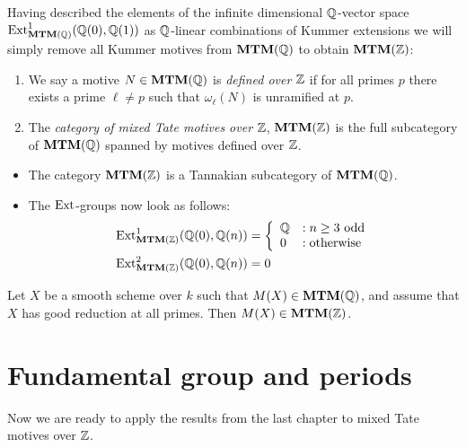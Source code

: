 Having described the elements of the infinite dimensional $\mathbb{Q}$-vector
space $\mathrm{Ext}^{1}_{\mathbf{MTM}(\mathbb{Q})}(\mathbb{Q}(0),\mathbb{Q}(1))$ as $\mathbb{Q}$-linear combinations
of Kummer extensions we will simply remove all Kummer motives from
$\mathbf{MTM}(\mathbb{Q})$ to obtain $\mathbf{MTM}(\mathbb{Z})$:
\begin{defn}
  \begin{enumerate}
  \item We say a motive $N\in\mathbf{MTM}(\mathbb{Q})$ is \emph{defined over $\mathbb{Z}$} if
    for all primes $p$ there exists a prime $\ell\neq p$
    such that $\omega_{\ell}(N)$ is unramified at $p$.
  \item The \emph{category of mixed Tate motives over $\mathbb{Z}$},
    $\mathbf{MTM}(\mathbb{Z})$ is the full subcategory of $\mathbf{MTM}(\mathbb{Q})$ spanned by
    motives defined over $\mathbb{Z}$.
  \end{enumerate}
\end{defn}

\begin{rem}\label{rem:9-mtmZ}
\begin{itemize}
\item The category $\mathbf{MTM}(\mathbb{Z})$ is a Tannakian subcategory of $\mathbf{MTM}(\mathbb{Q})$.
\item The $\mathrm{Ext}$-groups now look as follows:
  \begin{align*}
    \mathrm{Ext}^1_{\mathbf{MTM}(\mathbb{Z})}(\mathbb{Q}(0), \mathbb{Q}(n)) &= \left\{ \begin{array}{ll}
        \mathbb{Q} &:n\geq 3 \textrm{ odd} \\
        0 &:\textrm{otherwise}
      \end{array} \right.\\
    \mathrm{Ext}^2_{\mathbf{MTM}(\mathbb{Z})}(\mathbb{Q}(0), \mathbb{Q}(n)) &= 0
  \end{align*}
\end{itemize}
\end{rem}

\begin{exam}
  Let $X$ be a smooth scheme over $k$ such that $M(X) \in
  \mathbf{MTM}(\mathbb{Q})$, and assume that $X$ has good reduction at all
  primes. Then $M(X) \in \mathbf{MTM}(\mathbb{Z})$.
\end{exam}

\section{Fundamental group and periods}
Now we are ready to apply the results from the last chapter to mixed
Tate motives over $\mathbb{Z}$.

